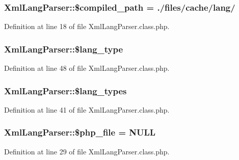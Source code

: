 \subsubsection[{\$compiled\+\_\+path}]{\setlength{\rightskip}{0pt plus 5cm}Xml\+Lang\+Parser\+::\$compiled\+\_\+path = \textquotesingle{}./files/cache/lang/\textquotesingle{}}\label{classXmlLangParser_af56d412775229f27848e533873fe94f3}


Definition at line 18 of file Xml\+Lang\+Parser.\+class.\+php.

\hypertarget{classXmlLangParser_ac1289e1d349c8e40ef4afd26941cba5d}{}
\subsubsection[{\$lang\+\_\+type}]{\setlength{\rightskip}{0pt plus 5cm}Xml\+Lang\+Parser\+::\$lang\+\_\+type}\label{classXmlLangParser_ac1289e1d349c8e40ef4afd26941cba5d}


Definition at line 48 of file Xml\+Lang\+Parser.\+class.\+php.

\hypertarget{classXmlLangParser_a0385e815b92b65f3b3d12a29e54d1e36}{}
\subsubsection[{\$lang\+\_\+types}]{\setlength{\rightskip}{0pt plus 5cm}Xml\+Lang\+Parser\+::\$lang\+\_\+types}\label{classXmlLangParser_a0385e815b92b65f3b3d12a29e54d1e36}


Definition at line 41 of file Xml\+Lang\+Parser.\+class.\+php.

\hypertarget{classXmlLangParser_a0f8639ef765df04b8c4e7903de4353bb}{}
\subsubsection[{\$php\+\_\+file}]{\setlength{\rightskip}{0pt plus 5cm}Xml\+Lang\+Parser\+::\$php\+\_\+file = N\+U\+L\+L}\label{classXmlLangParser_a0f8639ef765df04b8c4e7903de4353bb}


Definition at line 29 of file Xml\+Lang\+Parser.\+class.\+php.

